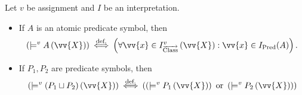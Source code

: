 \begin{definition}%
Let $v$ be assignment and $I$ be an interpretation.
\iffalse %
\begin{itemize}
\item If $A$ is an atomic predicate symbol, then
\[
\left(\models^v A\left(\vv{X}\right)\right) \IFFdef \left(\forall \vv{x}\in I_{\overrightarrow{\Class}}^v\left(\vv{X}\right):\vv{x}\in I_\Pred(A)
\right).
\]%

\item If $P_1,P_2$ are predicate symbols, then
\[
\left(\models^v (P_1\sqcup P_2)\left(\vv{X}\right)\right)
\IFFdef 
\left(
\left(\models^v P_1\left(\vv{X}\right)\right)
\ \text{or}\ 
\left(\models^v P_2\left(\vv{X}\right)\right)
\right)
\]%


%


\end{itemize}
\end{definition}
